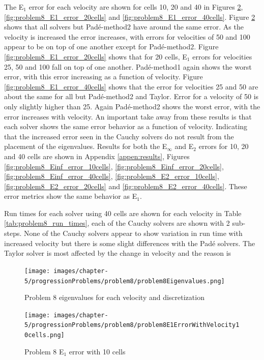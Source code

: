 The E${}_{1}$ error for each velocity are shown for cells 10, 20 and 40 in Figures \ref{fig:problem8_E1_error_10cells}, \ref{fig:problem8_E1_error_20cells} and \ref{fig:problem8_E1_error_40cells}. Figure \ref{fig:problem8_E1_error_10cells} shows that all solvers but Pad\'e-method2 have around the same error. As the velocity is increased the error increases, with errors for velocities of 50 and 100 appear to be on top of one another except for Pad\'e-method2. Figure \ref{fig:problem8_E1_error_20cells} shows that for 20 cells, E${}_{1}$ errors for velocities 25, 50 and 100 fall on top of one another. Pad\'e-method1 again shows the worst error, with this error increasing as a function of velocity. Figure \ref{fig:problem8_E1_error_40cells} shows that the error for velocities 25 and 50 are about the same for all but Pad\'e-method2 and Taylor. Error for a velocity of 50 is only slightly higher than 25. Again Pad\'e-method2 shows the worst error, with the error increases with velocity. An important take away from these results is that each solver shows the same error behavior as a function of velocity. Indicating that the increased error seen in the Cauchy solvers do not result from the placement of the eigenvalues. Results for both the E${}_{\infty}$ and E${}_{2}$ errors for 10, 20 and 40 cells are shown in Appendix \ref{appen:results}, Figures \ref{fig:problem8_Einf_error_10cells}, \ref{fig:problem8_Einf_error_20cells}, \ref{fig:problem8_Einf_error_40cells}, \ref{fig:problem8_E2_error_10cells}, \ref{fig:problem8_E2_error_20cells} and \ref{fig:problem8_E2_error_40cells}. These error metrics show the same behavior as E${}_{1}$. 

Run times for each solver using 40 cells are shown for each velocity in Table \ref{tab:problem8_run_times}, each of the Cauchy solvers are shown with 2 sub-steps. None of the Cauchy solvers appear to show variation in run time with increased velocity but there is some slight differences with the Pad\'e solvers. The Taylor solver is most affected by the change in velocity and the reason is 

\clearpage

\begin{figure}[p]
    \centering
    \texttt{[image: images/chapter-5/progressionProblems/problem8/problem8Eigenvalues.png]}
    \caption{Problem 8 eigenvalues for each velocity and discretization}
    \label{fig:problem8_eigenvalues}
\end{figure}

\clearpage

\begin{figure}[p]
    \centering
    \texttt{[image: images/chapter-5/progressionProblems/problem8/problem8E1ErrorWithVelocity10cells.png]}
    \caption{Problem 8 E${}_{1}$ error with 10 cells}
    \label{fig:problem8_E1_error_10cells}
\end{figure}


